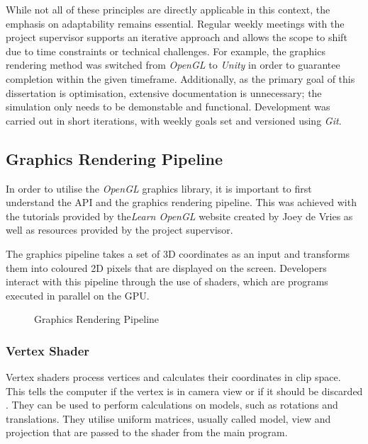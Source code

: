 \documentclass[12pt]{article}
\newcommand{\wideimage}[2][]{%
  \makebox[\textwidth][c]{\texttt{[image: \#2]}}%
}
\begin{document}
    While not all of these principles are directly applicable in this context, the emphasis on adaptability remains essential. Regular weekly meetings with the project supervisor supports an iterative approach and allows the scope to shift due to time constraints or technical challenges. For example, the graphics rendering method was switched from \textit{OpenGL} to \textit{Unity} in order to guarantee completion within the given timeframe. Additionally, as the primary goal of this dissertation is optimisation, extensive documentation is unnecessary; the simulation only needs to be demonstable and functional. Development was carried out in short iterations, with weekly goals set and versioned using \textit{Git}.

    \subsection{Graphics Rendering Pipeline}

    In order to utilise the \textit{OpenGL} graphics library\cite{opengl}, it is important to first understand the API and the graphics rendering pipeline. This was achieved with the tutorials provided by the\textit{Learn OpenGL} website created by Joey de Vries\cite{learnopengl} as well as resources provided by the project supervisor.

    The graphics pipeline takes a set of 3D coordinates as an input and transforms them into coloured 2D pixels that are displayed on the screen. Developers interact with this pipeline through the use of shaders, which are programs executed in parallel on the GPU.

    \begin{figure}[H]
        \noindent\wideimage[]{graphicsPipeline.png}
        \caption{Graphics Rendering Pipeline \cite{learnopengl}}
    \end{figure}

    \subsubsection{Vertex Shader}

    Vertex shaders process vertices and calculates their coordinates in clip space. This tells the computer if the vertex is in camera view or if it should be discarded \cite{shadertutorial}. They can be used to perform calculations on models, such as rotations and translations. They utilise uniform matrices, usually called model, view and projection that are passed to the shader from the main program.
\end{document}
